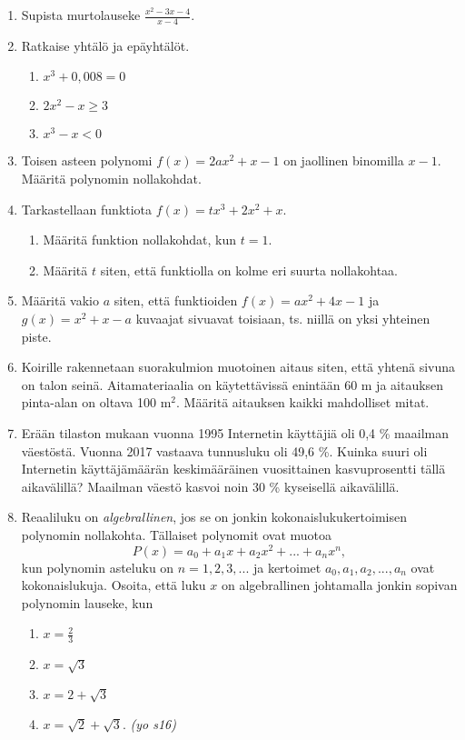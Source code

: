 \documentclass[12pt,fleqn]{article}
\begin{document}
\begin{enumerate}[label=\textbf{\arabic*.}]
\item Supista murtolauseke \(\displaystyle \frac{x^2-3x-4}{x-4}\).

\item Ratkaise yhtälö ja epäyhtälöt.
\begin{enumerate}[label=\textbf{\alph*)}]
\item \(x^3+0,008=0\)
\item \(2x^2-x\geq 3\)
\item \(x^3-x < 0\)
\end{enumerate}

\item Toisen asteen polynomi \(f(x)=2ax^2+x-1\) on jaollinen binomilla \(x-1\). Määritä polynomin nollakohdat.

\item Tarkastellaan funktiota \(f(x)=tx^3+2x^2+x\).
\begin{enumerate}[label=\textbf{\alph*)}]
\item Määritä funktion nollakohdat, kun \(t=1\).
\item Määritä \(t\) siten, että funktiolla on kolme eri suurta nollakohtaa.
\end{enumerate}

\item Määritä vakio \(a\) siten, että funktioiden \(f(x)=ax^2+4x-1\) ja \(g(x)=x^2+x-a\) kuvaajat sivuavat toisiaan, ts. niillä on yksi yhteinen piste.

\item Koirille rakennetaan suorakulmion muotoinen aitaus siten, että yhtenä sivuna on talon seinä. Aitamateriaalia on käytettävissä enintään 60 m ja aitauksen pinta-alan on oltava 100 m\(^2\). Määritä aitauksen kaikki mahdolliset mitat.

\item Erään tilaston mukaan vuonna 1995 Internetin käyttäjiä oli 0,4 \% maailman väestöstä. Vuonna 2017 vastaava tunnusluku oli 49,6 \%. Kuinka suuri oli Internetin käyttäjämäärän keskimääräinen vuosittainen kasvuprosentti tällä aikavälillä? Maailman väestö kasvoi noin 30 \% kyseisellä aikavälillä.

\item Reaaliluku on \emph{algebrallinen}, jos se on jonkin kokonaislukukertoimisen polynomin nollakohta. Tällaiset polynomit ovat muotoa
\[P(x)=a_0+a_1 x+a_2 x^2+...+a_n x^n,\]
kun polynomin asteluku on \(n=1,2,3,...\) ja kertoimet \(a_0,a_1,a_2,...,a_n\) ovat kokonaislukuja. Osoita, että luku \(x\) on algebrallinen johtamalla jonkin sopivan polynomin lauseke, kun
\begin{enumerate}[label=\textbf{\alph*)}]
\item \(\displaystyle x=\frac{2}{3}\)
\item \(\displaystyle x=\sqrt{3}\)
\item \(\displaystyle x=2+\sqrt{3}\)
\item \(\displaystyle x=\sqrt{2}+\sqrt{3}\). \emph{(yo s16)}
\end{enumerate}
\newpage

\end{enumerate}
\end{document}
